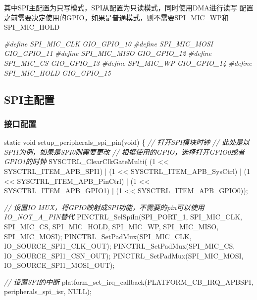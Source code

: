 \documentclass[
  12pt,
]{book}
\newenvironment{Shaded}{\begin{snugshade}}{\end{snugshade}}
\newcommand{\CommentTok}[1]{\textcolor[rgb]{0.56,0.35,0.01}{\textit{#1}}}
\newcommand{\DataTypeTok}[1]{\textcolor[rgb]{0.13,0.29,0.53}{#1}}
\newcommand{\DecValTok}[1]{\textcolor[rgb]{0.00,0.00,0.81}{#1}}
\newcommand{\NormalTok}[1]{#1}
\newcommand{\PreprocessorTok}[1]{\textcolor[rgb]{0.56,0.35,0.01}{\textit{#1}}}
\begin{document}
其中SPI主配置为只写模式，SPI从配置为只读模式，同时使用DMA进行读写 配置之前需要决定使用的GPIO，如果是普通模式，则不需要SPI\_MIC\_WP和SPI\_MIC\_HOLD

\begin{Shaded}
\begin{Highlighting}[]
\PreprocessorTok{#define SPI_MIC_CLK         GIO_GPIO_10}
\PreprocessorTok{#define SPI_MIC_MOSI        GIO_GPIO_11}
\PreprocessorTok{#define SPI_MIC_MISO        GIO_GPIO_12}
\PreprocessorTok{#define SPI_MIC_CS          GIO_GPIO_13}
\PreprocessorTok{#define SPI_MIC_WP          GIO_GPIO_14}
\PreprocessorTok{#define SPI_MIC_HOLD        GIO_GPIO_15}
\end{Highlighting}
\end{Shaded}

\hypertarget{spiux4e3bux914dux7f6e-1}{%
\subsection{SPI主配置}\label{spiux4e3bux914dux7f6e-1}}

\hypertarget{ux63a5ux53e3ux914dux7f6e-2}{%
\subsubsection{接口配置}\label{ux63a5ux53e3ux914dux7f6e-2}}

\begin{Shaded}
\begin{Highlighting}[]
\DataTypeTok{static} \DataTypeTok{void}\NormalTok{ setup_peripherals_spi_pin(}\DataTypeTok{void}\NormalTok{)}
\NormalTok{\{}
    \CommentTok{// 打开SPI模块时钟}
    \CommentTok{// 此处是以SPI1为例，如果是SPI0则需要更改}
    \CommentTok{// 根据使用的GPIO，选择打开GPIO0或者GPIO1的时钟}
\NormalTok{    SYSCTRL_ClearClkGateMulti(    (}\DecValTok{1}\NormalTok{ << SYSCTRL_ITEM_APB_SPI1)}
\NormalTok{                                | (}\DecValTok{1}\NormalTok{ << SYSCTRL_ITEM_APB_SysCtrl)}
\NormalTok{                                | (}\DecValTok{1}\NormalTok{ << SYSCTRL_ITEM_APB_PinCtrl)}
\NormalTok{                                | (}\DecValTok{1}\NormalTok{ << SYSCTRL_ITEM_APB_GPIO1)}
\NormalTok{                                | (}\DecValTok{1}\NormalTok{ << SYSCTRL_ITEM_APB_GPIO0));}

    \CommentTok{// 设置IO MUX，将GPIO映射成SPI功能，不需要的pin可以使用IO_NOT_A_PIN替代}
\NormalTok{    PINCTRL_SelSpiIn(SPI_PORT_1, SPI_MIC_CLK, SPI_MIC_CS, SPI_MIC_HOLD, SPI_MIC_WP, SPI_MIC_MISO, SPI_MIC_MOSI);}
\NormalTok{    PINCTRL_SetPadMux(SPI_MIC_CLK, IO_SOURCE_SPI1_CLK_OUT);}
\NormalTok{    PINCTRL_SetPadMux(SPI_MIC_CS, IO_SOURCE_SPI1_CSN_OUT);}
\NormalTok{    PINCTRL_SetPadMux(SPI_MIC_MOSI, IO_SOURCE_SPI1_MOSI_OUT);}
    
    \CommentTok{// 设置SPI的中断}
\NormalTok{    platform_set_irq_callback(PLATFORM_CB_IRQ_APBSPI, peripherals_spi_isr, NULL);}
\end{Highlighting}
\end{Shaded}
\end{document}
